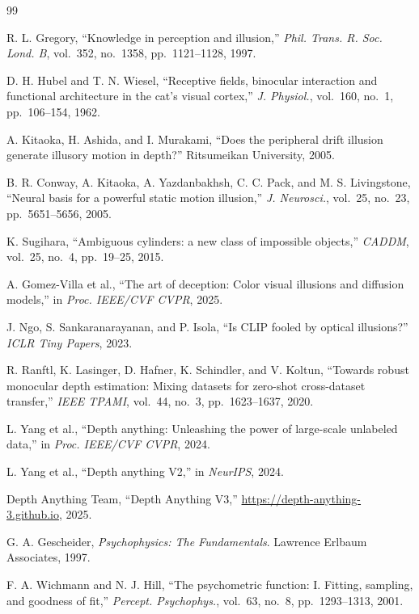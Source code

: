 \documentclass[10pt,twocolumn]{article}
\begin{document}
\begin{thebibliography}{99}

R. L. Gregory, ``Knowledge in perception and illusion,''
\emph{Phil. Trans. R. Soc. Lond. B}, vol.~352, no.~1358,
pp.~1121--1128, 1997.

D. H. Hubel and T. N. Wiesel, ``Receptive fields, binocular interaction and
functional architecture in the cat's visual cortex,''
\emph{J. Physiol.}, vol.~160, no.~1, pp.~106--154, 1962.

A. Kitaoka, H. Ashida, and I. Murakami, ``Does the peripheral drift illusion
generate illusory motion in depth?'' Ritsumeikan University, 2005.

B. R. Conway, A. Kitaoka, A. Yazdanbakhsh, C. C. Pack, and M. S. Livingstone,
``Neural basis for a powerful static motion illusion,''
\emph{J. Neurosci.}, vol.~25, no.~23, pp.~5651--5656, 2005.

K. Sugihara, ``Ambiguous cylinders: a new class of impossible objects,''
\emph{CADDM}, vol.~25, no.~4, pp.~19--25, 2015.

A. Gomez-Villa et al., ``The art of deception: Color visual illusions and diffusion
models,'' in \emph{Proc. IEEE/CVF CVPR}, 2025.

J. Ngo, S. Sankaranarayanan, and P. Isola, ``Is CLIP fooled by optical illusions?''
\emph{ICLR Tiny Papers}, 2023.

R. Ranftl, K. Lasinger, D. Hafner, K. Schindler, and V. Koltun,
``Towards robust monocular depth estimation: Mixing datasets for zero-shot
cross-dataset transfer,'' \emph{IEEE TPAMI}, vol.~44, no.~3, pp.~1623--1637, 2020.

L. Yang et al., ``Depth anything: Unleashing the power of large-scale unlabeled
data,'' in \emph{Proc. IEEE/CVF CVPR}, 2024.

L. Yang et al., ``Depth anything V2,'' in \emph{NeurIPS}, 2024.

Depth Anything Team, ``Depth Anything V3,''
\url{https://depth-anything-3.github.io}, 2025.

G. A. Gescheider, \emph{Psychophysics: The Fundamentals}.
Lawrence Erlbaum Associates, 1997.

F. A. Wichmann and N. J. Hill, ``The psychometric function: I. Fitting, sampling,
and goodness of fit,'' \emph{Percept. Psychophys.}, vol.~63, no.~8,
pp.~1293--1313, 2001.


\end{thebibliography}
\end{document}
